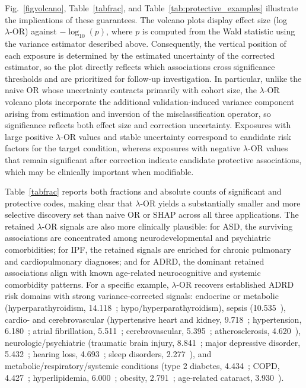 \documentclass[pdflatex,sn-mathphys-num]{sn-jnl}%
\newcommand{\SPOR}{\textrm{$\lambda$-OR}}
\theoremstyle{thmstyleone}%
\theoremstyle{thmstyletwo}%
\theoremstyle{thmstylethree}%
\begin{document}
Fig.~\ref{figvolcano}, Table~\ref{tabfrac}, and Table~\ref{tab:protective_examples} illustrate the implications of these guarantees. The volcano plots display effect size (log $\SPOR$) against $-\log_{10}(p)$, where $p$ is computed from the Wald statistic using the variance estimator described above. Consequently, the vertical position of each exposure is determined by the estimated uncertainty of the corrected estimator, so the plot directly reflects which associations cross significance thresholds and are prioritized for follow-up investigation. In particular, unlike the naive OR whose uncertainty contracts primarily with cohort size, the $\SPOR$ volcano plots incorporate the additional validation-induced variance component arising from estimation and inversion of the misclassification operator, so significance reflects both effect size and correction uncertainty. Exposures with large positive $\lambda$-OR values and stable uncertainty correspond to candidate risk factors for the target condition, whereas exposures with negative $\lambda$-OR values that remain significant after correction indicate candidate protective associations, which may be clinically important when modifiable.

Table~\ref{tabfrac} reports both fractions and absolute counts of significant and protective codes, making clear that $\SPOR$ yields a substantially smaller and more selective discovery set than naive OR or SHAP across all three applications. The retained $\SPOR$ signals are also more clinically plausible: for ASD, the surviving associations are concentrated among neurodevelopmental and psychiatric comorbidities; for IPF, the retained signals are enriched for chronic pulmonary and cardiopulmonary diagnoses; and for ADRD, the dominant retained associations align with known age-related neurocognitive and systemic comorbidity patterns. For a specific example, $\SPOR$ recovers established ADRD risk domains with strong variance-corrected signals: endocrine or metabolic (hyperparathyroidism, 14.118~\cite{HYPERPARATHYROIDISMmathur2022}; hypo/hyperparathyroidism), sepsis (10.535~\cite{SEPSISzeng2024}), cardio- and cerebrovascular (hypertensive heart and kidney, 9.718~\cite{CKDkelly2022}; hypertension, 6.180~\cite{HYPERTENSIONcarey2023}; atrial fibrillation, 5.511~\cite{ATRIALFIBRpapanastasiou2021}; cerebrovascular, 5.395~\cite{CEREBROVASCULARlove2016}; atherosclerosis, 4.620~\cite{ATHEROSCLEROSISnordestgaard2022}), neurologic/psychiatric (traumatic brain injury, 8.841~\cite{TBIgu2022}; major depressive disorder, 5.432~\cite{DEPRESSIONsaiz2021}; hearing loss, 4.693~\cite{HEARINGlitke2021}; sleep disorders, 2.277~\cite{SLEEPchoe2022}), and metabolic/respiratory/systemic conditions (type 2 diabetes, 4.434~\cite{T2DMathanasaki2022}; COPD, 4.427~\cite{COPDwang2022}; hyperlipidemia, 6.000~\cite{HYPERLIPIDEMIAezkurdia2023}; obesity, 2.791~\cite{OBESITYbeydoun2008}; age-related cataract, 3.930~\cite{CATARACTjun2012}).
\end{document}

